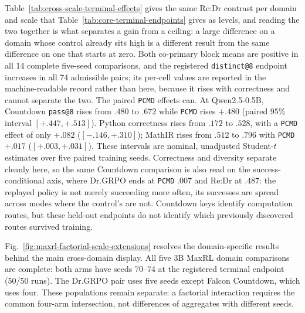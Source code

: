 \documentclass{article}
\makeatletter
\newcommand{\1}{\mathbf 1}
\newcommand{\pmd}{\texttt{PCMD}}
\newcommand{\distk}{\texttt{distinct@8}}
\theoremstyle{remark}
\theoremstyle{definition}
\theoremstyle{plain}
\makeatother
\begin{document}
Table~\ref{tab:cross-scale-terminal-effects} gives the same Re:Dr contrast per
domain and scale that Table~\ref{tab:core-terminal-endpoints} gives as levels,
and reading the two together is what separates a gain from a ceiling: a large
difference on a domain whose control already sits high is a different result
from the same difference on one that starts at zero. Both co-primary block
means are positive in all 14 complete five-seed comparisons, and the registered
\distk{} endpoint increases in all 74 admissible pairs; its per-cell values are reported in the machine-readable
record rather than here, because it rises with correctness and cannot separate
the two. The paired \pmd{} effects can. At Qwen2.5-0.5B, Countdown
\texttt{pass@8} rises from $.480$ to $.672$ while \pmd{} rises $+.480$ (paired
95\% interval $[+.447,+.513]$). Python correctness rises from $.172$ to $.528$,
with a \pmd{} effect of only $+.082$ ($[-.146,+.310]$); MathIR rises from
$.512$ to $.796$ with \pmd{} $+.017$ ($[+.003,+.031]$). These intervals are
nominal, unadjusted Student-$t$ estimates over five paired training seeds.
Correctness and diversity separate cleanly here, so the same Countdown
comparison is also read on the
success-conditional axis, where Dr.GRPO ends at \pmd{} $.007$ and
Re:Dr at $.487$: the replayed policy is not merely succeeding more
often, its successes are spread across modes where the control's are not. Countdown keys identify computation routes, but
these held-out endpoints do not identify which previously discovered
routes survived training.


Fig.~\ref{fig:maxrl-factorial-scale-extensions} resolves the domain-specific
results behind the main cross-domain display. All five 3B MaxRL domain comparisons are complete:
both arms have seeds 70--74 at the registered terminal endpoint (50/50 runs).
The Dr.GRPO pair uses five seeds except Falcon Countdown, which uses four. These populations
remain separate: a factorial interaction requires the common four-arm
intersection, not differences of aggregates with different seeds.
\end{document}
